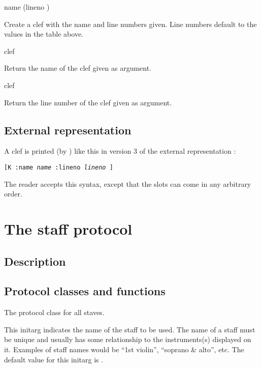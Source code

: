 


 {name \optional (lineno )}

Create a clef with the name and line numbers given.  Line numbers
default to the values in the table above. 

 {clef}

Return the name of the clef given as argument.

 {clef}

Return the line number of the clef given as argument. 

\subsection{External representation}

A clef is printed (by ) like this in version 3
of the external representation :

\texttt{[K :name \textit{name} :lineno \textit{lineno} ]}

The reader accepts this syntax, except that the slots can come in any
arbitrary order. 

\section{The staff protocol}

\subsection{Description}

\subsection{Protocol classes and functions}


The protocol class for all staves. 


This initarg indicates the name of the staff to be used.  The name of
a staff must be unique and usually has some relationship to the
instruments(s) displayed on it.  Examples of staff names would be
``1st violin'', ``soprano \& alto'', etc.  The default value for this
initarg is .

